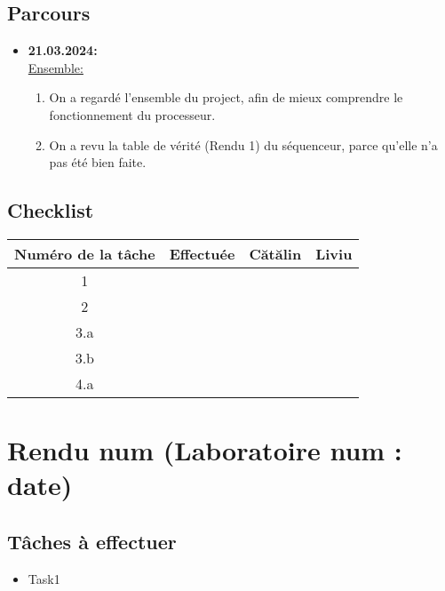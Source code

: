 \documentclass{article}
\begin{document}
    \subsection{Parcours}
    \begin{itemize}
        \item \textbf{21.03.2024:} \\
        \underline{Ensemble:}
        \begin{enumerate}
            \item On a regardé l'ensemble du project, afin de mieux comprendre le fonctionnement du processeur.
            \item On a revu la table de vérité (Rendu 1) du séquenceur, parce qu'elle n'a pas été bien faite.
        \end{enumerate}
    \end{itemize}
    \subsection{Checklist}
    \begin{center}
        \begin{tabular}{|c|c|c|c|}
            \hline
            Numéro de la tâche & Effectuée & Cătălin & Liviu \\
            \hline
            \hline 1 &   &   &   \\ 
            \hline 2 &   &   &   \\
            \hline 3.a &   &   &   \\
            \hline 3.b &   &   &   \\
            \hline 4.a &   &   &   \\
            \hline
        \end{tabular}
    \end{center}
    \newpage

    \section{Rendu num (Laboratoire num : date) }
    \subsection{Tâches à effectuer}
    \begin{itemize}
        \item Task1
    \end{itemize}
    \newpage
\end{document}
